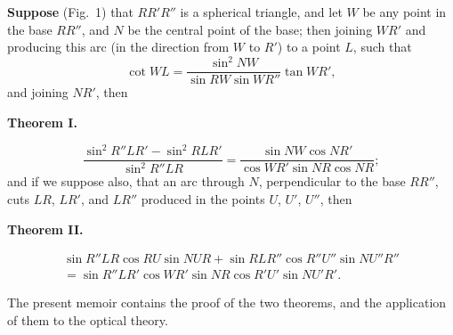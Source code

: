 \documentclass[11pt,a4paper]{book}
\begin{document}
\textbf{Suppose} (Fig.~1) that $RR'R''$ is a spherical triangle, and let $W$ be any point in the base $RR''$, and $N$ be the central point of the base; then joining $WR'$ and producing this arc (in the direction from $W$ to $R'$) to a point $L$, such that
\[
\cot WL=\frac{\sin^2NW}{\sin RW\sin WR''}\tan WR',
\]
and joining $NR'$, then

\begin{center}
\textbf{Theorem I.}
\end{center}
\[
\frac{\sin^2R''LR'-\sin^2RLR'}{\sin^2R''LR}
=\frac{\sin NW\cos NR'}{\cos WR'\sin NR\cos NR};
\]
and if we suppose also, that an arc through $N$, perpendicular to the base $RR''$, cuts $LR$, $LR'$, and $LR''$ produced in the points $U$, $U'$, $U''$, then

\begin{center}
\textbf{Theorem II.}
\end{center}
\begin{multline*}
\sin R''LR\cos RU\sin NUR+\sin RLR''\cos R''U''\sin NU''R''\\
=\sin R''LR'\cos WR'\sin NR\cos R'U'\sin NU'R'.
\end{multline*}

The present memoir contains the proof of the two theorems, and the application of them to the optical theory.
\end{document}

